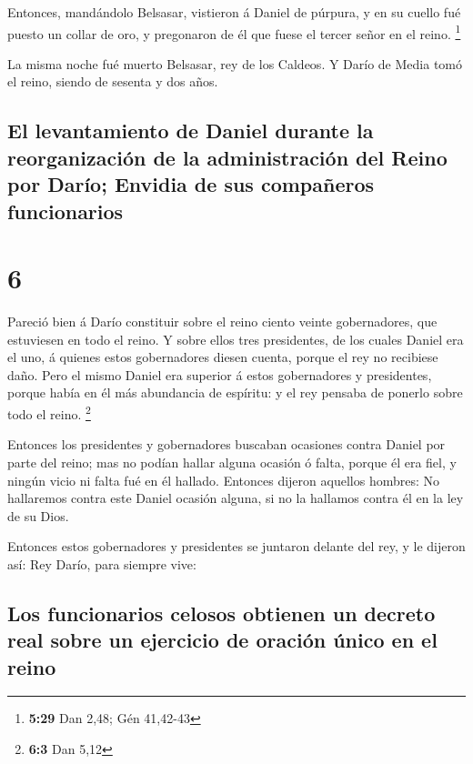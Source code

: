  Entonces, mandándolo Belsasar, vistieron á Daniel de
púrpura, y en su cuello fué puesto un collar de oro, y pregonaron de él
que fuese el tercer señor en el reino. \footnote{\textbf{5:29} Dan 2,48;
  Gén 41,42-43}

 La misma noche fué muerto Belsasar, rey de los Caldeos.
 Y Darío de Media tomó el reino, siendo de sesenta y dos
años.

\hypertarget{el-levantamiento-de-daniel-durante-la-reorganizaciuxf3n-de-la-administraciuxf3n-del-reino-por-daruxedo-envidia-de-sus-compauxf1eros-funcionarios}{%
\subsection{El levantamiento de Daniel durante la reorganización de la
administración del Reino por Darío; Envidia de sus compañeros
funcionarios}\label{el-levantamiento-de-daniel-durante-la-reorganizaciuxf3n-de-la-administraciuxf3n-del-reino-por-daruxedo-envidia-de-sus-compauxf1eros-funcionarios}}

\hypertarget{section-5}{%
\section{6}\label{section-5}}

 Pareció bien á Darío constituir sobre el reino ciento
veinte gobernadores, que estuviesen en todo el reino.  Y
sobre ellos tres presidentes, de los cuales Daniel era el uno, á quienes
estos gobernadores diesen cuenta, porque el rey no recibiese daño.
 Pero el mismo Daniel era superior á estos gobernadores y
presidentes, porque había en él más abundancia de espíritu: y el rey
pensaba de ponerlo sobre todo el reino. \footnote{\textbf{6:3} Dan 5,12}

 Entonces los presidentes y gobernadores buscaban ocasiones
contra Daniel por parte del reino; mas no podían hallar alguna ocasión ó
falta, porque él era fiel, y ningún vicio ni falta fué en él hallado.
 Entonces dijeron aquellos hombres: No hallaremos contra
este Daniel ocasión alguna, si no la hallamos contra él en la ley de su
Dios.

 Entonces estos gobernadores y presidentes se juntaron
delante del rey, y le dijeron así: Rey Darío, para siempre vive:

\hypertarget{los-funcionarios-celosos-obtienen-un-decreto-real-sobre-un-ejercicio-de-oraciuxf3n-uxfanico-en-el-reino}{%
\subsection{Los funcionarios celosos obtienen un decreto real sobre un
ejercicio de oración único en el
reino}\label{los-funcionarios-celosos-obtienen-un-decreto-real-sobre-un-ejercicio-de-oraciuxf3n-uxfanico-en-el-reino}}

